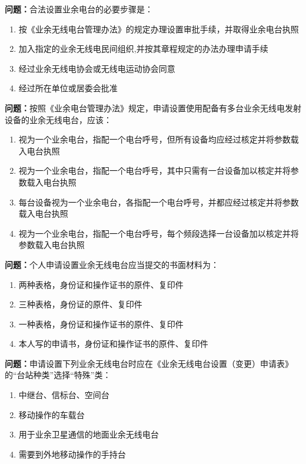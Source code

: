 \documentclass[UTF8]{ctexbook}
\begin{document}
\textbf{问题：}合法设置业余电台的必要步骤是：
\begin{enumerate}[label=\Alph*), leftmargin=3em]
  \item 按《业余无线电台管理办法》的规定办理设置审批手续，并取得业余电台执照
  \item 加入指定的业余无线电民间组织,并按其章程规定的办法办理申请手续
  \item 经过业余无线电协会或无线电运动协会同意
  \item 经过所在单位或居委会批准
\end{enumerate}

\textbf{问题：}按照《业余电台管理办法》规定，申请设置使用配备有多台业余无线电发射设备的业余无线电台，应该：
\begin{enumerate}[label=\Alph*), leftmargin=3em]
  \item 视为一个业余电台，指配一个电台呼号，但所有设备均应经过核定并将参数载入电台执照
  \item 视为一个业余电台，指配一个电台呼号，其中只需有一台设备加以核定并将参数载入电台执照
  \item 每台设备视为一个业余电台，各指配一个电台呼号，并都应经过核定并将参数载入电台执照
  \item 视为一个业余电台，指配一个电台呼号，每个频段选择一台设备加以核定并将参数载入电台执照
\end{enumerate}

\textbf{问题：}个人申请设置业余无线电台应当提交的书面材料为：
\begin{enumerate}[label=\Alph*), leftmargin=3em]
  \item 两种表格，身份证和操作证书的原件、复印件
  \item 三种表格，身份证的原件、复印件
  \item 一种表格，身份证和操作证书的原件、复印件
  \item 本人写的申请书，身份证和操作证书的原件、复印件
\end{enumerate}

\textbf{问题：}申请设置下列业余无线电台时应在《业余无线电台设置（变更）申请表》 的“台站种类”选择“特殊”类：
\begin{enumerate}[label=\Alph*), leftmargin=3em]
  \item 中继台、信标台、空间台
  \item 移动操作的车载台
  \item 用于业余卫星通信的地面业余无线电台
  \item 需要到外地移动操作的手持台
\end{enumerate}
\end{document}
